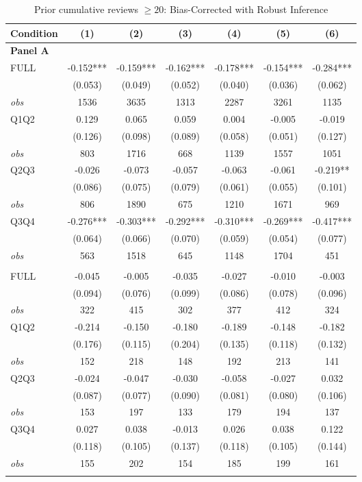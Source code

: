 \begin{table}[!htbp]
\centering
\caption{Prior cumulative reviews $\geq20$: Bias-Corrected with Robust Inference}
\begin{tabular}{lcccccc}
\toprule
Condition & (1) & (2) & (3) & (4) & (5) & (6) \\
\midrule
\multicolumn{7}{l}{\textbf{Panel A}} \\

FULL & -0.152*** & -0.159*** & -0.162*** & -0.178*** & -0.154*** & -0.284*** \\
 & (0.053) & (0.049) & (0.052) & (0.040) & (0.036) & (0.062) \\
\textit{obs} & 1536 & 3635 & 1313 & 2287 & 3261 & 1135 \\
Q1Q2 & 0.129 & 0.065 & 0.059 & 0.004 & -0.005 & -0.019 \\
 & (0.126) & (0.098) & (0.089) & (0.058) & (0.051) & (0.127) \\
\textit{obs} & 803 & 1716 & 668 & 1139 & 1557 & 1051 \\
Q2Q3 & -0.026 & -0.073 & -0.057 & -0.063 & -0.061 & -0.219** \\
 & (0.086) & (0.075) & (0.079) & (0.061) & (0.055) & (0.101) \\
\textit{obs} & 806 & 1890 & 675 & 1210 & 1671 & 969 \\
Q3Q4 & -0.276*** & -0.303*** & -0.292*** & -0.310*** & -0.269*** & -0.417*** \\
 & (0.064) & (0.066) & (0.070) & (0.059) & (0.054) & (0.077) \\
\textit{obs} & 563 & 1518 & 645 & 1148 & 1704 & 451 \\
\addlinespace
\multicolumn{7}{l}{\textbf{Panel B}} \\

FULL & -0.045 & -0.005 & -0.035 & -0.027 & -0.010 & -0.003 \\
 & (0.094) & (0.076) & (0.099) & (0.086) & (0.078) & (0.096) \\
\textit{obs} & 322 & 415 & 302 & 377 & 412 & 324 \\
Q1Q2 & -0.214 & -0.150 & -0.180 & -0.189 & -0.148 & -0.182 \\
 & (0.176) & (0.115) & (0.204) & (0.135) & (0.118) & (0.132) \\
\textit{obs} & 152 & 218 & 148 & 192 & 213 & 141 \\
Q2Q3 & -0.024 & -0.047 & -0.030 & -0.058 & -0.027 & 0.032 \\
 & (0.087) & (0.077) & (0.090) & (0.081) & (0.080) & (0.106) \\
\textit{obs} & 153 & 197 & 133 & 179 & 194 & 137 \\
Q3Q4 & 0.027 & 0.038 & -0.013 & 0.026 & 0.038 & 0.122 \\
 & (0.118) & (0.105) & (0.137) & (0.118) & (0.105) & (0.144) \\
\textit{obs} & 155 & 202 & 154 & 185 & 199 & 161 \\
\addlinespace
\multicolumn{7}{l}{\textbf{Panel C}} \\


\end{tabular}
\end{table}
